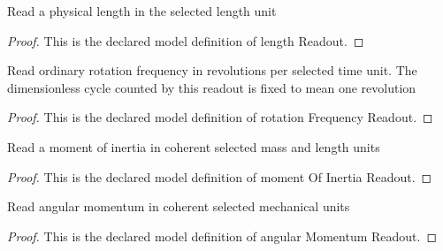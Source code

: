 \begin{definition}
  \label{def:physics:phyx-mini-0711:phyxminiproblems-problemphyxmini0711-lengthreadout}
  Read a physical length in the selected length unit
\end{definition}
\begin{proof}
  This is the declared model definition of length Readout.
\end{proof}
\begin{definition}
  \label{def:physics:phyx-mini-0711:phyxminiproblems-problemphyxmini0711-rotationfrequencyreadout}
  Read ordinary rotation frequency in revolutions per selected time unit. The dimensionless cycle counted by this readout is fixed to mean one revolution
\end{definition}
\begin{proof}
  This is the declared model definition of rotation Frequency Readout.
\end{proof}
\begin{definition}
  \label{def:physics:phyx-mini-0711:phyxminiproblems-problemphyxmini0711-momentofinertiareadout}
  Read a moment of inertia in coherent selected mass and length units
\end{definition}
\begin{proof}
  This is the declared model definition of moment Of Inertia Readout.
\end{proof}
\begin{definition}
  \label{def:physics:phyx-mini-0711:phyxminiproblems-problemphyxmini0711-angularmomentumreadout}
  Read angular momentum in coherent selected mechanical units
\end{definition}
\begin{proof}
  This is the declared model definition of angular Momentum Readout.
\end{proof}
